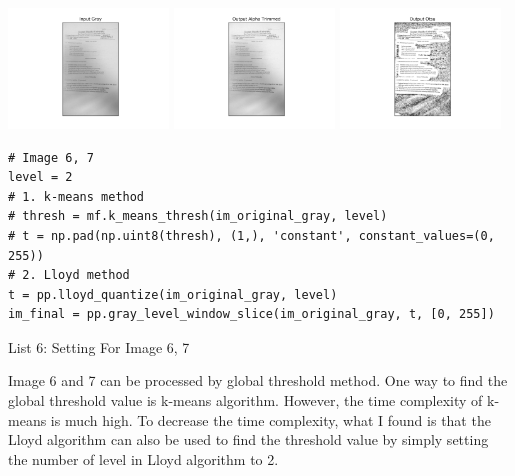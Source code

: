 \documentclass[titlepage]{article}
\begin{document}
\begin{center}
\includegraphics[width=0.32\textwidth]{img_5_gray.png}
\includegraphics[width=0.32\textwidth]{img_5_output_alpha_trimmed.png}
\includegraphics[width=0.32\textwidth]{img_5_output_otsu.png}
\end{center}

\begin{listing}
\begin{verbatim}
# Image 6, 7 
level = 2
# 1. k-means method
# thresh = mf.k_means_thresh(im_original_gray, level)
# t = np.pad(np.uint8(thresh), (1,), 'constant', constant_values=(0, 255))
# 2. Lloyd method
t = pp.lloyd_quantize(im_original_gray, level)
im_final = pp.gray_level_window_slice(im_original_gray, t, [0, 255])
\end{verbatim}
\centering
\caption{List 6: Setting For Image 6, 7}
\newline
\end{listing}

Image 6 and 7 can be processed by global threshold method. One way to find the
global threshold value is k-means algorithm. However, the time complexity of
k-means is much high. To decrease the time complexity, what I found is that
the Lloyd algorithm can also be used to find the threshold value by simply
setting the number of level in Lloyd algorithm to 2.
\end{document}
